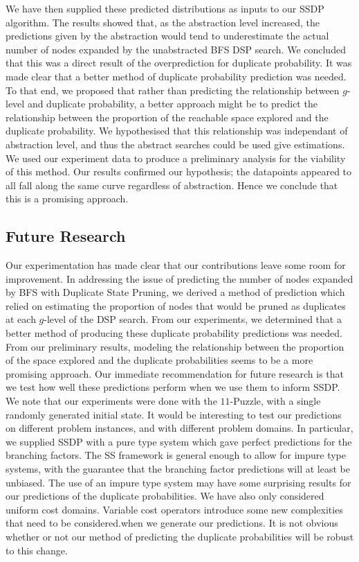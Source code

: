 \documentclass{article}
\begin{document}
We have then supplied these predicted distributions as inputs to our SSDP algorithm.
The results showed that, as the abstraction level increased, the predictions given by the abstraction
would tend to underestimate the actual number of nodes expanded by the unabstracted BFS DSP search.
We concluded that this was a direct result of the overprediction for duplicate probability.
It was made clear that a better method of duplicate probability prediction was needed.
To that end, we proposed that rather than predicting the relationship between \(g\)-level and duplicate probability,
a better approach might be to predict the relationship between the proportion of the reachable space explored
and the duplicate probability. We hypothesised that this relationship was independant of abstraction level,
and thus the abstract searches could be used give estimations.
We used our experiment data to produce a preliminary analysis for
the viability of this method. Our results confirmed our hypothesis; the datapoints appeared to all fall along
the same curve regardless of abstraction. Hence we conclude that this is a promising approach.

\subsection{Future Research}
Our experimentation has made clear that our contributions leave some room for improvement.
In addressing the issue of predicting the number of nodes expanded by BFS with Duplicate State Pruning, we derived a method of prediction which relied on estimating the proportion of nodes that would be pruned as duplicates at each \(g\)-level of the DSP search. From our experiments,
we determined that a better method of producing these duplicate probability predictions was needed. From our preliminary results, modeling the relationship between the proportion of the space explored and the duplicate probabilities seems to be a more promising approach. Our immediate recommendation for future research is that we test how well these predictions perform when we use them to inform SSDP. \\

We note that our experiments were done with the \(11\)-Puzzle, with a single randomly generated initial state. It would be interesting to test our predictions on different problem instances, and with different problem domains. In particular, we supplied SSDP with a pure type system which gave perfect predictions for the branching factors. The SS framework is general enough to allow for impure type systems, with the guarantee that the branching factor predictions will at least be unbiased. The use of an impure type system may have some surprising results for our predictions of the duplicate probabilities.
We have also only considered uniform cost domains. Variable cost operators introduce some new complexities that need to be considered.when we generate our predictions. It is not obvious whether or not our method of predicting the duplicate probabilities will be robust to this change. \\
\end{document}
